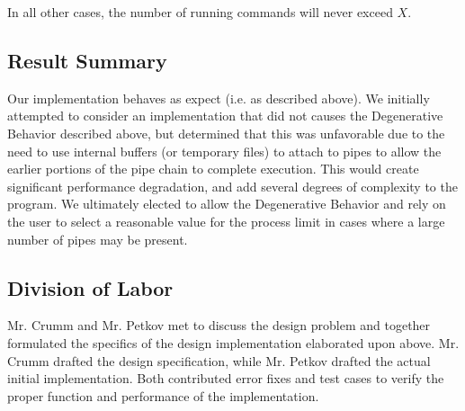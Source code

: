 \documentclass[paper=letter, fontsize=11pt]{scrartcl} %
\begin{document}
In all other cases, the number of running commands will never exceed $X$.

\subsection{Result Summary}
Our implementation behaves as expect (i.e. as described above). We initially attempted to consider an implementation that did not causes the Degenerative Behavior described above, but determined that this was unfavorable due to the need to use internal buffers (or temporary files) to attach to pipes to allow the earlier portions of the pipe chain to complete execution. This would create significant performance degradation, and add several degrees of complexity to the program. We ultimately elected to allow the Degenerative Behavior and rely on the user to select a reasonable value for the process limit in cases where a large number of pipes may be present.

\subsection{Division of Labor}
Mr. Crumm and Mr. Petkov met to discuss the design problem and together formulated the specifics of the design implementation elaborated upon above. Mr. Crumm drafted the design specification, while Mr. Petkov drafted the actual initial implementation. Both contributed error fixes and test cases to verify the proper function and performance of the implementation.

\end{document}
